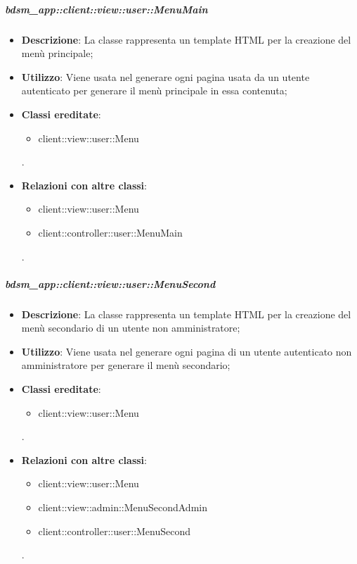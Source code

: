 		\subparagraph{bdsm\_app::client::view::user::MenuMain} %
		\label{subp:bdsm_app_client_view_user_menumain}
			\begin{itemize}
				\item \textbf{Descrizione}: La classe rappresenta un template HTML per la creazione del menù principale;
				\item \textbf{Utilizzo}: Viene usata nel generare ogni pagina usata da un utente autenticato per generare il menù principale in essa contenuta;
				\item \textbf{Classi ereditate}: 
					\begin{itemize}
						\item client::view::user::Menu						
					\end{itemize}.
				\item \textbf{Relazioni con altre classi}: 		
					\begin{itemize}
						\item client::view::user::Menu
						\item client::controller::user::MenuMain							
					\end{itemize}.
			\end{itemize}

		\subparagraph{bdsm\_app::client::view::user::MenuSecond} %
		\label{subp:bdsm_app_client_view_user_menusecond}
			\begin{itemize}
				\item \textbf{Descrizione}: La classe rappresenta un template HTML per la creazione del menù secondario di un utente non amministratore;
				\item \textbf{Utilizzo}: Viene usata nel generare ogni pagina di un utente autenticato non amministratore per generare il menù secondario;
				\item \textbf{Classi ereditate}: 				
					\begin{itemize}
						\item client::view::user::Menu						
					\end{itemize}.
				\item \textbf{Relazioni con altre classi}: 		
					\begin{itemize}
						\item client::view::user::Menu
						\item client::view::admin::MenuSecondAdmin
						\item client::controller::user::MenuSecond	
					\end{itemize}.
			\end{itemize}

